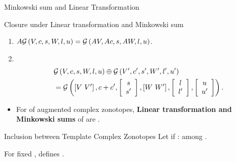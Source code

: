 \begin{frame}{Minkowski sum and Linear Transformation}
\begin{block}{Closure under Linear transformation and Minkowski sum}
\begin{enumerate}
\item $A\mathcal{G}\left(V,c,s,W,l,u\right) = \mathcal{G}\left(AV,Ac,s,AW,l,u\right)$.
\item $~$\vspace{-2em}\hspace{-2em}\begin{align*}
&\mathcal{G}\left(V,c,s,W,l,u\right)\oplus\mathcal{G}\left(V^\prime,c^\prime,s^\prime,W^\prime,l^\prime,u^\prime\right)\\
&= \mathcal{G}\left(\left[V~V^\prime\right],c+c^\prime,\left[\begin{array}{c}{s}\\{s^\prime} \end{array}\right],\left[W~W^\prime\right],\left[\begin{array}{c}{l}\\{l^\prime} \end{array}\right],\left[\begin{array}{c}{u}\\{u^\prime} \end{array}\right]\right).
\end{align*}
\end{enumerate}
\end{block}
%
\begin{alertblock}{}
\begin{itemize}
\item For  of augmented complex zonotopes, {\bf Linear transformation and Minkowski sums} of are .
\end{itemize}
\end{alertblock}
\end{frame}
%
\begin{frame}{Inclusion between Template Complex Zonotopes}
Let  if
: \eqncol{$(\order)\implies(\subseteq)$} among .
%
\begin{alertblock}{}
For fixed , \textcol{$\order$} defines .
\end{alertblock}
\end{frame}
%
